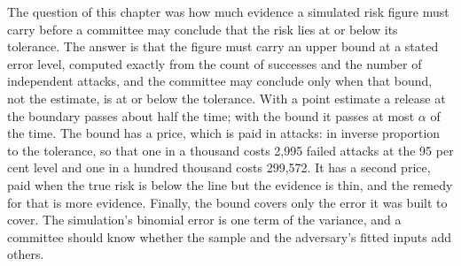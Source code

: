 The question of this chapter was how much evidence a simulated risk figure must carry
before a committee may conclude that the risk lies at or below its tolerance. The answer
is that the figure must carry an upper bound at a stated error level, computed exactly
from the count of successes and the number of independent attacks, and the committee may
conclude only when that bound, not the estimate, is at or below the tolerance. With a
point estimate a release at the boundary passes about half the time; with the bound it
passes at most $\alpha$ of the time. The bound has a price, which is paid in attacks: in
inverse proportion to the tolerance, so that one in a thousand costs 2,995 failed attacks
at the 95 per cent level and one in a hundred thousand costs 299,572. It has a second
price, paid when the true risk is below the line but the evidence is thin, and the
remedy for that is more evidence. Finally, the bound covers only the error it was built
to cover. The simulation's binomial error is one term of the variance, and a committee
should know whether the sample and the adversary's fitted inputs add others.

